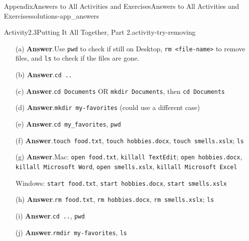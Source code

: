 \documentclass[twoside,10pt,]{book}
\newcommand{\blocktitlefont}{\relax}
\newcommand{\mono}[1]{\texttt{#1}}
\begin{document}
\begin{solutions-chapter}{Appendix}{Answers to All Activities and Exercises}{}{Answers to All Activities and Exercises}{}{}{solutions-app_answers}
\begin{activitysolution}{Activity}{2.3}{Putting It All Together, Part 2.}{activity-try-removing}
\begin{enumerate}[font=\bfseries,label=(\alph*),ref=\alph*]%
\item[(a)]\noindent\textbf{\blocktitlefont Answer}.\hypertarget{answer-try-removing-d-b-back}{}\quad{}Use \mono{pwd} to check if still on Desktop, \mono{rm <file-name>} to remove files, and \mono{ls} to check if the files are gone.%
\item[(b)]\noindent\textbf{\blocktitlefont Answer}.\hypertarget{answer-try-removing-e-b-back}{}\quad{}\mono{cd ..}%
\item[(c)]\noindent\textbf{\blocktitlefont Answer}.\hypertarget{answer-try-removing-f-b-back}{}\quad{}\mono{cd Documents} OR \mono{mkdir Documents}, then \mono{cd Documents}%
\item[(d)]\noindent\textbf{\blocktitlefont Answer}.\hypertarget{answer-try-removing-g-b-back}{}\quad{}\mono{mkdir my-favorites} (could use a different case)%
\item[(e)]\noindent\textbf{\blocktitlefont Answer}.\hypertarget{answer-try-removing-h-b-back}{}\quad{}\mono{cd my\_favorites}, \mono{pwd}%
\item[(f)]\noindent\textbf{\blocktitlefont Answer}.\hypertarget{answer-try-removing-i-b-back}{}\quad{}\mono{touch food.txt}, \mono{touch hobbies.docx}, \mono{touch smells.xslx}; \mono{ls}%
\item[(g)]\noindent\textbf{\blocktitlefont Answer}.\hypertarget{answer-try-removing-j-b-back}{}\quad{}Mac: \mono{open food.txt}, \mono{killall TextEdit}; \mono{open hobbies.docx}, \mono{killall \textquotesingle{}Microsoft Word\textquotesingle{}}, \mono{open smells.xslx}, \mono{killall \textquotesingle{}Microsoft Excel\textquotesingle{}}%
\par
Windows: \mono{start food.txt}, \mono{start hobbies.docx}, \mono{start smells.xslx}%
\item[(h)]\noindent\textbf{\blocktitlefont Answer}.\hypertarget{answer-try-removing-k-b-back}{}\quad{}\mono{rm food.txt}, \mono{rm hobbies.docx}, \mono{rm smells.xslx}; \mono{ls}%
\item[(i)]\noindent\textbf{\blocktitlefont Answer}.\hypertarget{answer-try-removing-l-b-back}{}\quad{}\mono{cd ..}, \mono{pwd}%
\item[(j)]\noindent\textbf{\blocktitlefont Answer}.\hypertarget{answer-try-removing-m-b-back}{}\quad{}\mono{rmdir my-favorites}, \mono{ls}%
\end{enumerate}%
\end{activitysolution}%
\par\medskip

\end{solutions-chapter}
\end{document}
